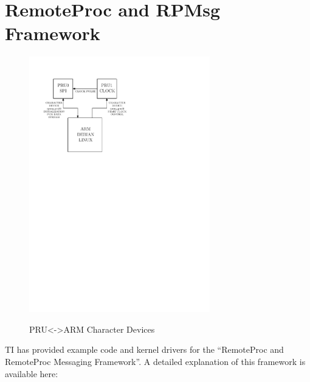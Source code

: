 %
%
%

\chapter{RemoteProc and RPMsg Framework}

\begin{figure}[h]
	\centering
    \includegraphics[width=0.7\textwidth]{diagrams/char_devices_2}
	\centering\bfseries
	\caption{PRU<->ARM Character Devices}
\end{figure}

TI has provided example code and kernel drivers for the ``RemoteProc and RemoteProc Messaging Framework''.  A detailed explanation of this framework is available here:

